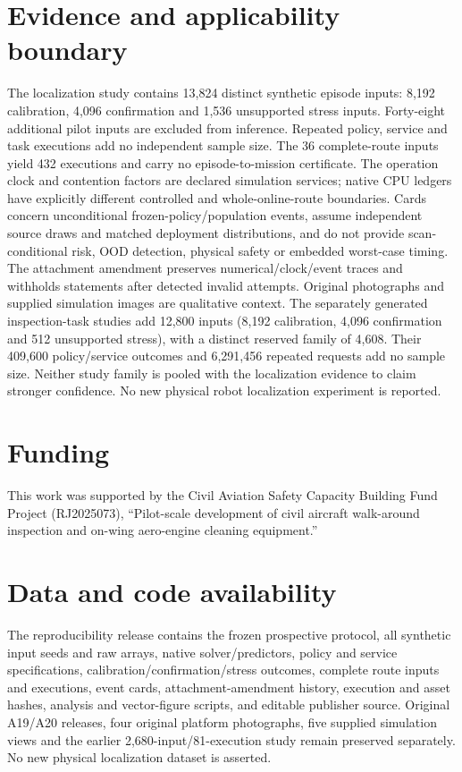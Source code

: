 \documentclass[final,3p,times]{elsarticle}
\begin{document}
\section*{Evidence and applicability boundary}
The localization study contains 13,824 distinct synthetic episode inputs: 8,192 calibration, 4,096 confirmation and 1,536 unsupported stress inputs. Forty-eight additional pilot inputs are excluded from inference. Repeated policy, service and task executions add no independent sample size. The 36 complete-route inputs yield 432 executions and carry no episode-to-mission certificate. The operation clock and contention factors are declared simulation services; native CPU ledgers have explicitly different controlled and whole-online-route boundaries. Cards concern unconditional frozen-policy/population events, assume independent source draws and matched deployment distributions, and do not provide scan-conditional risk, OOD detection, physical safety or embedded worst-case timing. The attachment amendment preserves numerical/clock/event traces and withholds statements after detected invalid attempts. Original photographs and supplied simulation images are qualitative context. The separately generated inspection-task studies add 12,800 inputs (8,192 calibration, 4,096 confirmation and 512 unsupported stress), with a distinct reserved family of 4,608. Their 409,600 policy/service outcomes and 6,291,456 repeated requests add no sample size. Neither study family is pooled with the localization evidence to claim stronger confidence. No new physical robot localization experiment is reported.
\section*{Funding}
This work was supported by the Civil Aviation Safety Capacity Building Fund Project (RJ2025073), ``Pilot-scale development of civil aircraft walk-around inspection and on-wing aero-engine cleaning equipment.''
\section*{Data and code availability}
The reproducibility release contains the frozen prospective protocol, all synthetic input seeds and raw arrays, native solver/predictors, policy and service specifications, calibration/confirmation/stress outcomes, complete route inputs and executions, event cards, attachment-amendment history, execution and asset hashes, analysis and vector-figure scripts, and editable publisher source. Original A19/A20 releases, four original platform photographs, five supplied simulation views and the earlier 2,680-input/81-execution study remain preserved separately. No new physical localization dataset is asserted.
\end{document}
